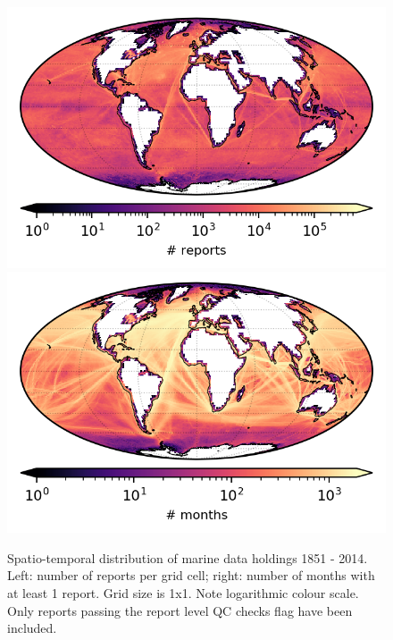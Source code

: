 \begin{figure}[h]
\includegraphics{resources/header-reports-map-optimal.png}
\includegraphics{resources/header-months-map-optimal.png}
\caption{Spatio-temporal distribution of marine data holdings 1851 - 2014. Left: number of reports per grid cell; right: number of months with at least 1 report. Grid size is 1x1. Note logarithmic colour scale. Only reports passing the report level QC checks flag have been included.}
\label{fig:nreports-map1}
\end{figure}

\newpage
